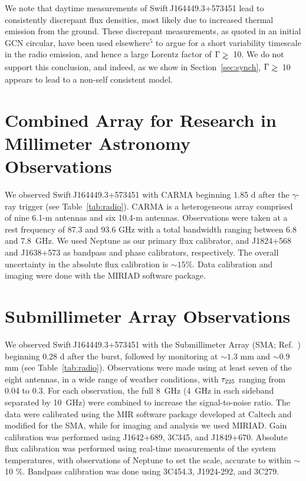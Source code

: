 We note that daytime measurements of Swift\,J164449.3+573451 lead to
consistently discrepant flux densities, most likely due to increased
thermal emission from the ground.  These discrepant measurements, as
quoted in an initial GCN circular, have been used
elsewhere$^{5}$ to argue for a short variability timescale in
the radio emission, and hence a large Lorentz factor of 
$\Gamma\simgt$~10.  We do not support this conclusion, 
and indeed, as we show in
Section~\ref{sec:synch}, $\Gamma\simgt$~10 appears to lead to a
non-self consistent model.


\section{Combined Array for Research in Millimeter Astronomy
Observations}
\label{sec:carma}

We observed Swift\,J164449.3+573451 with CARMA beginning 1.85 d after
the $\gamma$-ray trigger (see Table~\ref{tab:radio}).  CARMA is a
heterogeneous array comprised of nine 6.1-m antennas and six 10.4-m
antennas.  Observations were taken at a rest frequency of 87.3 and
93.6 GHz with a total bandwidth ranging between 6.8 and 7.8~GHz.  We
used Neptune as our primary flux calibrator, and J1824+568 and
J1638+573 as bandpass and phase calibrators, respectively.  The
overall uncertainty in the absolute flux calibration is $\sim 15\%$.
Data calibration and imaging were done with the MIRIAD software
package.


\section{Submillimeter Array Observations}
\label{sec:sma}

We observed Swift\,J164449.3+573451 with the Submillimeter Array (SMA;
Ref.~) beginning 0.28 d after the burst, followed by
monitoring at $\sim 1.3$ mm and $\sim 0.9$ mm (see
Table~\ref{tab:radio}).  Observations were made using at least seven
of the eight antennas, in a wide range of weather conditions, with
$\tau_{\rm 225}$ ranging from 0.04 to 0.3.  For each observation, the
full 8~GHz (4~GHz in each sideband separated by 10~GHz) were combined
to increase the signal-to-noise ratio.  The data were calibrated using
the MIR software package developed at Caltech and modified for the
SMA, while for imaging and analysis we used MIRIAD.  Gain calibration
was performed using J1642+689, 3C345, and J1849+670.  Absolute flux
calibration was performed using real-time measurements of the system
temperatures, with observations of Neptune to set the scale, accurate
to within $\sim$ 10 $\%$.
Bandpass calibration was done using 3C454.3, J1924-292, and 3C279.


